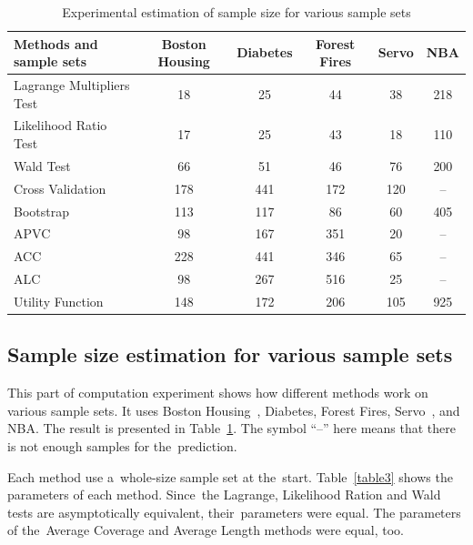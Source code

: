 \documentclass[
11pt,%
tightenlines,%
twoside,%
onecolumn,%
nofloats,%
nobibnotes,%
nofootinbib,%
superscriptaddress,%
noshowpacs,%
centertags]%
{revtex4}
\begin{document}
\begin{table}[!htp]
\centering
\caption{Experimental estimation of sample size  for various sample sets}
\label{table2}
\begin{tabular}{l|c|c|c|c|c}
\hline
 Methods and sample sets & Boston Housing & Diabetes & Forest Fires & Servo & NBA \\ \hline
Lagrange Multipliers Test & 18 & 25 & 44 & 38 & 218 \\ \hline
Likelihood Ratio Test & 17 & 25 & 43 & 18 & 110 \\ \hline
Wald Test & 66 & 51 & 46 & 76 & 200 \\ \hline
Cross Validation & 178 & 441 & 172 & 120 & -- \\ \hline
Bootstrap & 113 & 117 & 86 & 60 & 405 \\ \hline
APVC & 98 & 167 & 351 & 20 & -- \\ \hline
ACC & 228 & 441 & 346 & 65 & -- \\ \hline
ALC & 98 & 267 & 516 & 25 & -- \\ \hline
Utility Function & 148 & 172 & 206 & 105 & 925 \\ \hline
\end{tabular}
\end{table}

\subsection{Sample size estimation for various sample sets}
This part of computation experiment shows how different methods work on various sample sets. It uses Boston Housing~\cite{boston}, Diabetes, Forest Fires, Servo~\cite{servo}, and NBA.
The result is presented in Table~\ref{table2}. The symbol ``--'' here means that there is not enough samples for the~prediction.

Each method use a~whole-size sample set at the~start. Table~\ref{table3} shows the parameters of each method. Since~the Lagrange, Likelihood Ration and Wald tests are asymptotically equivalent, their~parameters were equal. The parameters of the~Average Coverage and Average Length methods were equal, too.
\end{document}
